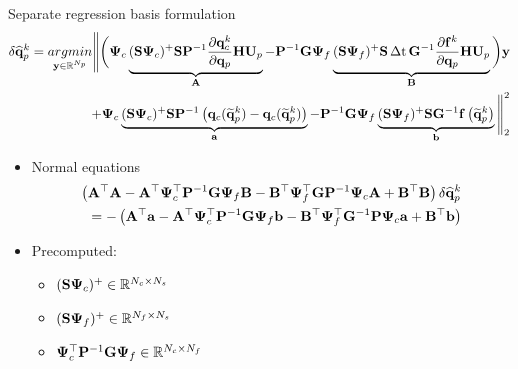 \documentclass[]{beamer}
\begin{document}
\begin{frame}{Separate regression basis formulation}
	\vspace{-1.9em}
	\footnotesize
	\begin{align*}
		\delta \primVecCoef^{\newtonIdx} = \underset{\dummyVec \in \mathbb{R}^{\numPrimModes}}{argmin} \Bigg\lVert \bigg(\deimBasisCons \underbrace{\deimRegressorConsTiny \sampMat \consScaleInv \pde{\consVec^{\newtonIdx}}{\primVec} \primScale \primTrial }_{\dummyMatOne} - \consScaleInv \rhsScale \deimBasisRhs \underbrace{\deimRegressorRhsTiny \sampMat \, \dt \, \rhsScaleInv \pde{\rhsVec^{\newtonIdx}}{\primVec} \primScale \primTrial}_{\dummyMatTwo} \bigg) \dummyVec \\
		+ \deimBasisCons \underbrace{\deimRegressorConsTiny \sampMat \consScaleInv \left( \consVec(\primVecRom^{\newtonIdx}) - \consVec(\primVecRom^{\newtonIdx}) \right)}_{\dummyVecOne} - \consScaleInv \rhsScale \deimBasisRhs \underbrace{\deimRegressorRhsTiny \sampMat \rhsScaleInv \rhsFunc{\primVecRom^{\newtonIdx}}}_{\dummyVecTwo} \Bigg\rVert_2^2
	\end{align*}
	\normalsize
	\vspace{-1em}
	\begin{itemize}
		\item Normal equations
		\begin{align*}
			\left(\dummyMatOne^\top \dummyMatOne - \dummyMatOne^\top \deimBasisCons^\top \consScaleInv \rhsScale \deimBasisRhs \dummyMatTwo - \dummyMatTwo^\top \deimBasisRhs^\top \rhsScale \consScaleInv \deimBasisCons \dummyMatOne + \dummyMatTwo^\top \dummyMatTwo \right) \delta \primVecCoef^{\newtonIdx} \\
			= -\left(\dummyMatOne^\top \dummyVecOne - \dummyMatOne^\top \deimBasisCons^\top \consScaleInv \rhsScale \deimBasisRhs \dummyVecTwo - \dummyMatTwo^\top \deimBasisRhs^\top \rhsScaleInv \consScale \deimBasisCons \dummyVecOne + \dummyMatTwo^\top \dummyVecTwo\right)
		\end{align*}
	\end{itemize}
	\begin{minipage}{0.49\linewidth}
		\begin{itemize}
			\item Precomputed:
			\begin{itemize}
				\item $\deimRegressorConsTiny \in \mathbb{R}^{\numConsvModes \times \numSamps}$
				\item $\deimRegressorRhsTiny \in \mathbb{R}^{\numRHSModes \times \numSamps}$
				\item $\deimBasisCons^\top \consScaleInv \rhsScale \deimBasisRhs \in \mathbb{R}^{\numConsvModes \times \numRHSModes}$

\end{itemize}
\end{itemize}
\end{minipage}
\end{frame}
\end{document}
